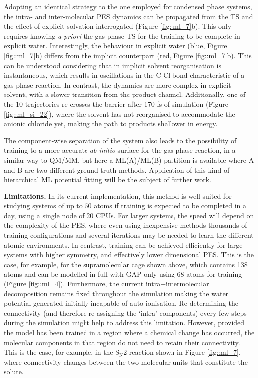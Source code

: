 \documentclass[../../main.tex]{subfiles}
\begin{document}
Adopting an identical strategy to the one employed for condensed phase systems, the intra- and inter-molecular PES dynamics can be propagated from the TS and the effect of explicit solvation interrogated (Figure \ref{fig::ml_7}b). This only requires knowing \emph{a priori} the gas-phase TS for the training to be complete in explicit water. Interestingly, the behaviour in explicit water (blue, Figure \ref{fig::ml_7}b) differs from the implicit counterpart (red, Figure \ref{fig::ml_7}b). This can be understood considering that in implicit solvent reorganisation is instantaneous, which results in oscillations in the C-Cl bond characteristic of a gas phase reaction. In contrast, the dynamics are more complex in explicit solvent, with a slower transition from the product channel. Additionally, one of the 10 trajectories re-crosses the barrier after 170 fs of simulation (Figure \ref{fig::ml_si_22}), where the solvent has not reorganised to accommodate the anionic chloride yet, making the path to products shallower in energy.

The component-wise separation of the system also leads to the possibility of training to a more accurate \emph{ab initio} surface for the gas phase reaction, in a similar way to QM/MM, but here a ML(A)/ML(B) partition is available where A and B are two different ground truth methods. Application of this kind of hierarchical ML potential fitting will be the subject of further work.


{\bfseries{Limitations.}} In its current implementation, this method is well suited for studying systems of up to 50 atoms if training is expected to be completed in a day, using a single node of 20 CPUs. For larger systems, the speed will depend on the complexity of the PES, where even using inexpensive methods thousands of training configurations and several iterations may be needed to learn the different atomic environments. In contrast, training can be achieved efficiently for large systems with higher symmetry, and effectively lower dimensional PES. This is the case, for example, for the supramolecular cage shown above, which contains 138 atoms and can be modelled in full with GAP only using 68 atoms for training (Figure \ref{fig::ml_4}). Furthermore, the current intra+intermolecular decomposition remains fixed throughout the simulation making the water potential generated initially incapable of auto-ionisation. Re-determining the connectivity (and therefore re-assigning the `intra' components) every few steps during the simulation might help to address this limitation. However, provided the model has been trained in a region where a chemical change has occurred, the molecular components in that region do not need to retain their connectivity. This is the case, for example, in the S${}_\text{N}$2 reaction shown in Figure \ref{fig::ml_7}, where connectivity changes between the two molecular units that constitute the solute.
\end{document}
